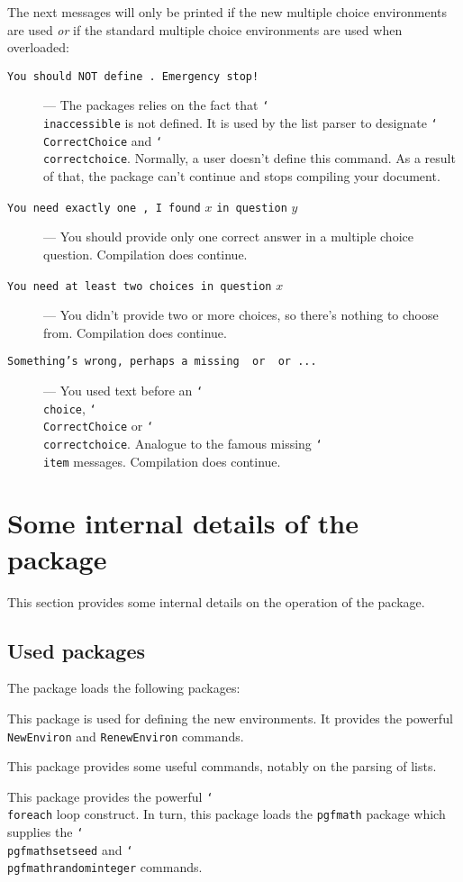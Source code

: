 \documentclass[12pt,a4paper]{exam}
\providecommand{\texorpdfstring}[2]{#1}
\newcommand{\bs}{\texorpdfstring{\char`\\}{}}
\begin{document}
The next messages will only be printed if the new multiple choice environments
are used \emph{or} if the standard multiple choice environments are used when
overloaded: 

\begin{description}
\item[\texttt{You should NOT define \string\inaccessible. Emergency stop!}] ---
The packages relies on the fact that \texttt{\bs inaccessible} is not defined. It is
used by the list parser to designate \texttt{\bs CorrectChoice} and
\texttt{\bs correctchoice}. Normally, a user doesn't define this command.
As a result of that, the package can't continue and stops compiling your document.

\item[\texttt{You need exactly one \string\CorrectChoice, I found} $x$
      \texttt{in question} $y$] --- You should provide only one correct
answer in a multiple choice question. Compilation does continue.

\item[\texttt{You need at least two choices in question} $x$] --- You didn't
provide two or more choices, so there's nothing to choose from. Compilation
does continue.     

\item[\texttt{Something's wrong, perhaps a missing \string\choice\ or \string\CorrectChoice\ or ...}] --- You used text before an \texttt{\bs choice}, \texttt{\bs CorrectChoice}
or \texttt{\bs correctchoice}. Analogue to the famous missing \texttt{\bs item} messages.
 Compilation does continue.
 
\end{description}



\section{Some internal details of the package}
This section provides some internal details on the operation of the package.

\subsection{Used packages}
The package loads the following packages:

\begin{description}[labelindent=2ex]
\item[\texttt{environ}] This package is used for defining the new environments. It provides
the powerful \texttt{NewEnviron} and \texttt{RenewEnviron} commands.
\item[\texttt{etoolbox}] This package provides some useful commands, notably on the parsing of lists.
\item[\texttt{pgffor}] This package provides the powerful \texttt{\bs foreach} loop
construct. In turn, this package loads the \texttt{pgfmath} package which supplies
the \texttt{\bs pgfmathsetseed} and \linebreak \texttt{\bs pgfmathrandominteger} commands.
\end{description}
\end{document}
